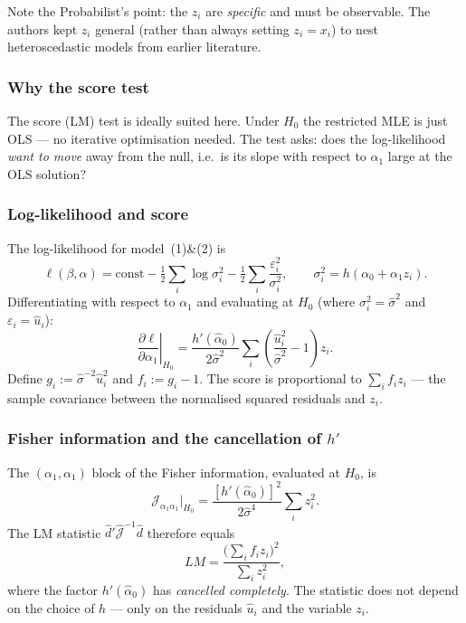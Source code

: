 \documentclass[a4paper,oneside,12pt]{extarticle}
\theoremstyle{plain}
\theoremstyle{definition}
\theoremstyle{remark}
\begin{document}
Note the Probabilist's point: the $z_i$ are \emph{specific} and must be
observable.  The authors kept $z_i$ general (rather than always
setting $z_i = x_i$) to nest heteroscedastic models from earlier
literature.

\subsubsection*{Why the score test}

The score (LM) test is ideally suited here.  Under $H_0$ the
restricted MLE is just OLS — no iterative optimisation needed.  The
test asks: does the log-likelihood \emph{want to move} away from the
null, i.e.\ is its slope with respect to $\alpha_1$ large at the OLS
solution?

\subsubsection*{Log-likelihood and score}

The log-likelihood for model~(1)\&(2) is
\[
  \ell(\beta,\alpha)
  = \mathrm{const}
    - \tfrac{1}{2}\sum_i \log\sigma_i^2
    - \tfrac{1}{2}\sum_i \frac{\varepsilon_i^2}{\sigma_i^2},
  \qquad \sigma_i^2 = h(\alpha_0 + \alpha_1 z_i).
\]
Differentiating with respect to $\alpha_1$ and evaluating at
$H_0$ (where $\sigma_i^2 = \hat\sigma^2$ and $\varepsilon_i =
\hat{u}_i$):
\[
  \left.\frac{\partial\ell}{\partial\alpha_1}\right|_{H_0}
  = \frac{h'(\hat\alpha_0)}{2\hat\sigma^2}
    \sum_i \left(\frac{\hat{u}_i^2}{\hat\sigma^2} - 1\right) z_i.
\]
Define $g_i := \hat\sigma^{-2}\hat{u}_i^2$ and $f_i := g_i - 1$.
The score is proportional to $\sum_i f_i z_i$ — the
sample covariance between the normalised squared residuals and $z_i$.

\subsubsection*{Fisher information and the cancellation of $h'$}

The $({\alpha_1},{\alpha_1})$ block of the Fisher information,
evaluated at $H_0$, is
\[
  \mathcal{J}_{\alpha_1\alpha_1}\big|_{H_0}
  = \frac{[h'(\hat\alpha_0)]^2}{2\hat\sigma^4}\sum_i z_i^2.
\]
The LM statistic $\hat{d}'\hat{\mathcal{J}}^{-1}\hat{d}$ therefore
equals
\[
  LM
  = \frac{\bigl(\sum_i f_i z_i\bigr)^2}{\sum_i z_i^2},
\]
where the factor $h'(\hat\alpha_0)$ has \emph{cancelled completely}.
The statistic does not depend on the choice of $h$ — only on the
residuals $\hat{u}_i$ and the variable $z_i$.
\end{document}
